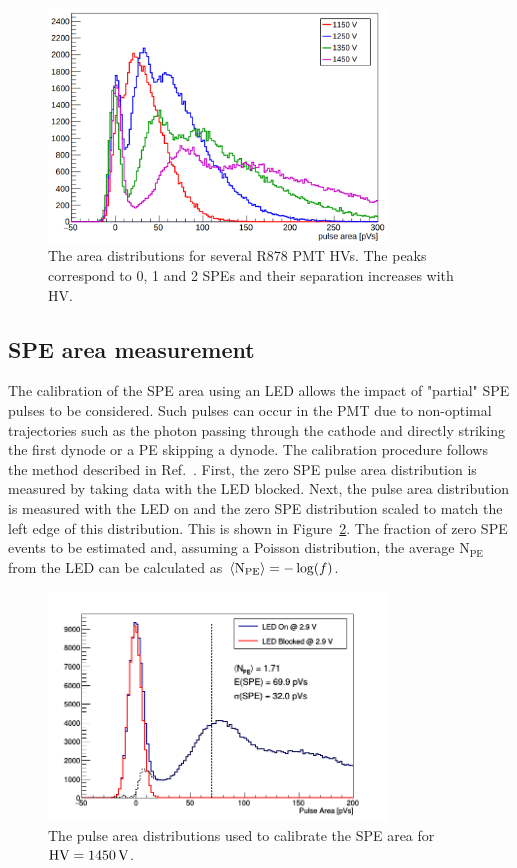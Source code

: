 \documentclass[12pt]{article}
\newcommand{\unit}[1]{\ensuremath{\text{\,#1}}\xspace}
\newcommand{\npe} {\mbox{\ensuremath{\textrm{N}_\textrm{PE}}\xspace}}
\begin{document}
\begin{figure}[ht!]
    \centering
    \includegraphics[width=0.8\textwidth]{figures/LEDareas}
    \caption{\label{fig:LEDPulseAreas} The area distributions for several R878 PMT HVs. The peaks correspond 
    to 0, 1 and 2 SPEs and their separation increases with HV.}
\end{figure}

\subsection{SPE area measurement}
\label{sec:ledarea}
The calibration of the SPE area using an LED allows the impact of "partial" SPE pulses to be considered.
Such pulses can occur in the PMT due to non-optimal trajectories such as the photon passing through the cathode and directly
striking the first dynode or a PE skipping a dynode. The calibration procedure follows the method described
in Ref.~\cite{Saldanha:2016mkn}. First, the zero SPE pulse area distribution is measured by taking data with the LED blocked.
Next, the pulse area distribution is measured with the LED on and the zero SPE distribution scaled to match the left edge of 
this distribution. This is shown in Figure~\ref{fig:SPEcalib}. The fraction of zero SPE events to be estimated and, assuming 
a Poisson distribution, the average \npe from the LED can be calculated as $\left< \npe \right> = -\log(f)$.

\begin{figure}[ht!]
    \centering
    \includegraphics[width=0.8\textwidth]{figures/speCalib}
    \caption{\label{fig:SPEcalib} The pulse area distributions used to calibrate the SPE area for
    $\text{HV}=1450\unit{V}$.}
\end{figure}
\end{document}
